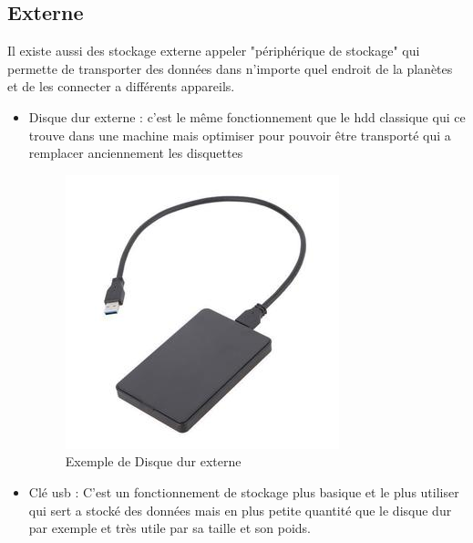 \documentclass[a4paper,12pt]{article}
\begin{document}
    \newpage
          
        \subsection{Externe}
        Il existe aussi des stockage externe appeler "périphérique de stockage" qui permette de transporter des données dans n'importe quel endroit de la planètes et de les connecter a différents appareils. \\
        
            \begin{itemize}
                \item Disque dur externe :
                    c'est le même fonctionnement que le hdd classique qui ce trouve dans une machine mais optimiser pour pouvoir être transporté qui a remplacer anciennement les disquettes \\
                    \begin{figure}[h!]
                        \centering
                        \includegraphics[scale=0.4]{Disque_dur_externe.jpg}
                        \caption{Exemple de Disque dur externe}
                        \label{fig: Exemple de Disque dur externe}
                    \end{figure}
                \item Clé usb : 
                    C'est un fonctionnement de stockage plus basique et le plus utiliser qui sert a stocké des données mais en plus petite quantité que le disque dur par exemple et très utile par sa taille et son poids.
                    \begin{figure}[h!]
                        \centering

\end{figure}
\end{itemize}
\end{document}
